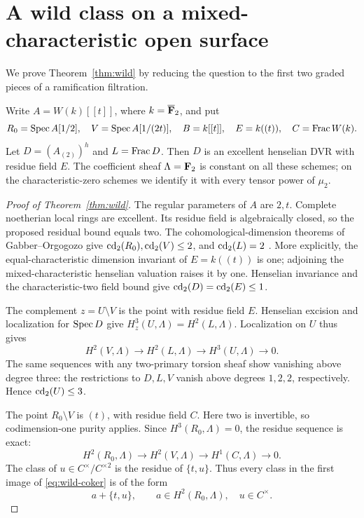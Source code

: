 \section{A wild class on a mixed-characteristic open surface}
We prove Theorem~\ref{thm:wild} by reducing the question to the
first two graded pieces of a ramification filtration.

Write $A=W(k)[[t]]$, where $k=\overline{\mathbf F}_2$, and put
\[
 R_0=\operatorname{Spec} A[1/2],\quad V=\operatorname{Spec} A[1/(2t)],\quad
 B=k[[t]],\quad E=k((t)),\quad C=\operatorname{Frac} W(k).
\]
Let $D=(A_{(2)})^h$ and $L=\operatorname{Frac} D$. Then $D$ is an excellent
henselian DVR with residue field $E$. The coefficient sheaf
$\Lambda=\mathbf F_2$ is constant on all these schemes; on the
characteristic-zero schemes we identify it with every tensor
power of $\mu_2$.

\begin{proof}[Proof of Theorem~\ref{thm:wild}]
The regular parameters of $A$ are $2,t$. Complete noetherian
local rings are excellent. Its residue field is algebraically
closed, so the proposed residual bound equals two.
The cohomological-dimension theorems of Gabber--Orgogozo give
$\operatorname{cd}_2(R_0),\operatorname{cd}_2(V)\le2$, and $\operatorname{cd}_2(L)=2$
\cite[Theorems 1.2 and 6.1]{GabberOrgogozo}. More explicitly,
the equal-characteristic dimension invariant of $E=k((t))$
is one; adjoining the mixed-characteristic henselian valuation
raises it by one. Henselian invariance and the characteristic-two
field bound give $\operatorname{cd}_2(D)=\operatorname{cd}_2(E)\le1$.

The complement $z=U\setminus V$ is the point with residue field
$E$. Henselian excision and localization for $\operatorname{Spec} D$ give
$H^3_z(U,\Lambda)=H^2(L,\Lambda)$. Localization on $U$ thus gives
\begin{equation}\label{eq:wild-coker}
 H^2(V,\Lambda)\longrightarrow H^2(L,\Lambda)
     \longrightarrow H^3(U,\Lambda)\longrightarrow0.
\end{equation}
The same sequences with any two-primary torsion sheaf show
vanishing above degree three: the restrictions to $D,L,V$
vanish above degrees $1,2,2$, respectively. Hence $\operatorname{cd}_2(U)\le3$.

The point $R_0\setminus V$ is $(t)$, with residue field $C$.
Here two is invertible, so codimension-one purity applies.
Since $H^3(R_0,\Lambda)=0$, the residue sequence is exact:
\[
 H^2(R_0,\Lambda)\longrightarrow H^2(V,\Lambda)
     \longrightarrow H^1(C,\Lambda)\longrightarrow0.
\]
The class of $u\in C^\times/C^{\times2}$ is the residue of
$\{t,u\}$. Thus every class in the first image of
\eqref{eq:wild-coker} is of the form
\begin{equation}\label{eq:wild-image}
 a+\{t,u\},\qquad a\in H^2(R_0,\Lambda),\quad u\in C^\times.
\end{equation}


\end{proof}

